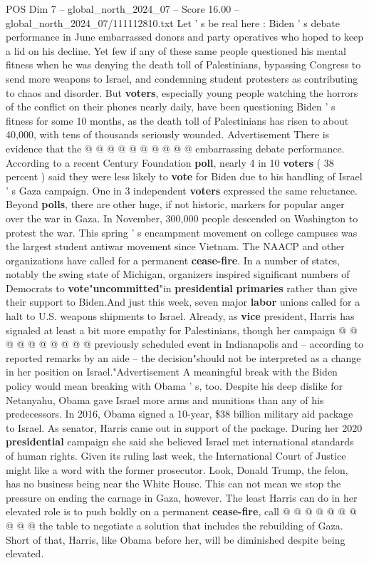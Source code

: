 \begin{textsample}{POS Dim 7 – global\_north\_2024\_07 – Score 16.00 – global\_north\_2024\_07/111112810.txt}
Let ' s be real here : Biden ' s debate performance in June embarrassed donors and party operatives who hoped to keep a lid on his decline.
Yet few if any of these same people questioned his mental fitness when he was denying the death toll of Palestinians, bypassing Congress to send more weapons to Israel, and condemning student protesters as contributing to chaos and disorder.
But \textbf{voters}, especially young people watching the horrors of the conflict on their phones nearly daily, have been questioning Biden ' s fitness for some 10 months, as the death toll of Palestinians has risen to about 40,000, with tens of thousands seriously wounded.
Advertisement There is evidence that the @ @ @ @ @ @ @ @ @ @ embarrassing debate performance.
According to a recent Century Foundation \textbf{poll}, nearly 4 in 10 \textbf{voters} ( 38 percent ) said they were less likely to \textbf{vote} for Biden due to his handling of Israel ' s Gaza campaign.
One in 3 independent \textbf{voters} expressed the same reluctance.
Beyond \textbf{polls}, there are other huge, if not historic, markers for popular anger over the war in Gaza.
In November, 300,000 people descended on Washington to protest the war.
This spring ' s encampment movement on college campuses was the largest student antiwar movement since Vietnam.
The NAACP and other organizations have called for a permanent \textbf{cease-fire}.
In a number of states, notably the swing state of Michigan, organizers inspired significant numbers of Democrats to \textbf{vote}"\textbf{uncommitted}"in \textbf{presidential} \textbf{primaries} rather than give their support to Biden.And just this week, seven major \textbf{labor} unions called for a halt to U.S. weapons shipments to Israel.
Already, as \textbf{vice} president, Harris has signaled at least a bit more empathy for Palestinians, though her campaign @ @ @ @ @ @ @ @ @ @ previously scheduled event in Indianapolis and -- according to reported remarks by an aide -- the decision"should not be interpreted as a change in her position on Israel."Advertisement A meaningful break with the Biden policy would mean breaking with Obama ' s, too.
Despite his deep dislike for Netanyahu, Obama gave Israel more arms and munitions than any of his predecessors.
In 2016, Obama signed a 10-year, \$38 billion military aid package to Israel.
As senator, Harris came out in support of the package.
During her 2020 \textbf{presidential} campaign she said she believed Israel met international standards of human rights.
Given its ruling last week, the International Court of Justice might like a word with the former prosecutor.
Look, Donald Trump, the felon, has no business being near the White House.
This can not mean we stop the pressure on ending the carnage in Gaza, however.
The least Harris can do in her elevated role is to push boldly on a permanent \textbf{cease-fire}, call @ @ @ @ @ @ @ @ @ @ the table to negotiate a solution that includes the rebuilding of Gaza.
Short of that, Harris, like Obama before her, will be diminished despite being elevated.

\end{textsample}
